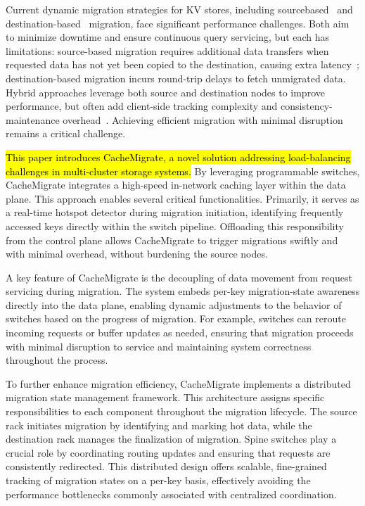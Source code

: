 \documentclass[conference]{IEEEtran}
\DeclareRobustCommand{\hlme}[1]{{\sethlcolor{white}\hl{#1}}}
\begin{document}
Current dynamic migration strategies for KV stores, including source\-based~\cite{kang2022remus} and destination-based~\cite{kulkarni2017rocksteady} migration, face significant performance challenges. Both aim to minimize downtime and ensure continuous query servicing, but each has limitations: source-based migration requires additional data transfers when requested data has not yet been copied to the destination, causing extra latency~\cite{kokkinos2016survey, lin2019mgcrab}; destination-based migration incurs round-trip delays to fetch unmigrated data. Hybrid approaches leverage both source and destination nodes to improve performance, but often add client-side tracking complexity and consistency-maintenance overhead~\cite{afonso2020combining}. Achieving efficient migration with minimal disruption remains a critical challenge.

\hlme{This paper introduces CacheMigrate, a novel solution addressing load-balancing challenges in multi-cluster storage systems.} By leveraging programmable switches, CacheMigrate integrates a high-speed in-network caching layer within the data plane. This approach enables several critical functionalities. Primarily, it serves as a real-time hotspot detector during migration initiation, identifying frequently accessed keys directly within the switch pipeline. Offloading this responsibility from the control plane allows CacheMigrate to trigger migrations swiftly and with minimal overhead, without burdening the source nodes.

A key feature of CacheMigrate is the decoupling of data movement from request servicing during migration. The system embeds per-key migration-state awareness directly into the data plane, enabling dynamic adjustments to the behavior of switches based on the progress of migration. For example, switches can reroute incoming requests or buffer updates as needed, ensuring that migration proceeds with minimal disruption to service and maintaining system correctness throughout the process.

To further enhance migration efficiency, CacheMigrate implements a distributed migration state management framework. This architecture assigns specific responsibilities to each component throughout the migration lifecycle. The source rack initiates migration by identifying and marking hot data, while the destination rack manages the finalization of migration. Spine switches play a crucial role by coordinating routing updates and ensuring that requests are consistently redirected. This distributed design offers scalable, fine-grained tracking of migration states on a per-key basis, effectively avoiding the performance bottlenecks commonly associated with centralized coordination.
\end{document}
